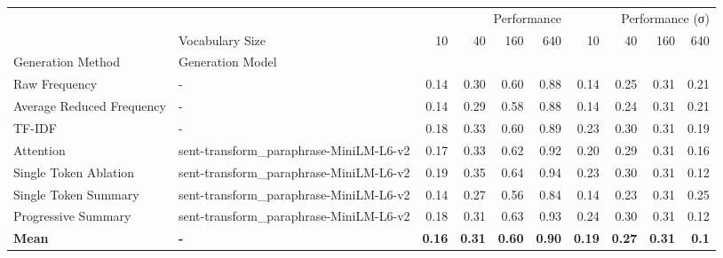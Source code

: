 \begin{tabular}{llrrrrrrrr}
\toprule
 &  & \multicolumn{4}{r}{Performance} & \multicolumn{4}{r}{Performance (σ)} \\
 & Vocabulary Size & 10 & 40 & 160 & 640 & 10 & 40 & 160 & 640 \\
Generation Method & Generation Model &  &  &  &  &  &  &  &  \\
\midrule
Raw Frequency & - & 0.14 & 0.30 & 0.60 & 0.88 & 0.14 & 0.25 & 0.31 & 0.21 \\
\cline{1-10}
Average Reduced Frequency & - & 0.14 & 0.29 & 0.58 & 0.88 & 0.14 & 0.24 & 0.31 & 0.21 \\
\cline{1-10}
TF-IDF & - & 0.18 & 0.33 & 0.60 & 0.89 & 0.23 & 0.30 & 0.31 & 0.19 \\
\cline{1-10}
Attention & sent-transform\_paraphrase-MiniLM-L6-v2 & 0.17 & 0.33 & 0.62 & 0.92 & 0.20 & 0.29 & 0.31 & 0.16 \\
\cline{1-10}
Single Token Ablation & sent-transform\_paraphrase-MiniLM-L6-v2 & 0.19 & 0.35 & 0.64 & 0.94 & 0.23 & 0.30 & 0.31 & 0.12 \\
\cline{1-10}
Single Token Summary & sent-transform\_paraphrase-MiniLM-L6-v2 & 0.14 & 0.27 & 0.56 & 0.84 & 0.14 & 0.23 & 0.31 & 0.25 \\
\cline{1-10}
Progressive Summary & sent-transform\_paraphrase-MiniLM-L6-v2 & 0.18 & 0.31 & 0.63 & 0.93 & 0.24 & 0.30 & 0.31 & 0.12 \\
\cline{1-10}
\midrule
\textbf{Mean} & \textbf{-} & \textbf{0.16} & \textbf{0.31} & \textbf{0.60} & \textbf{0.90} & \textbf{0.19} & \textbf{0.27} & \textbf{0.31} & \textbf{0.1} \\
\cline{1-10}
\bottomrule
\end{tabular}


